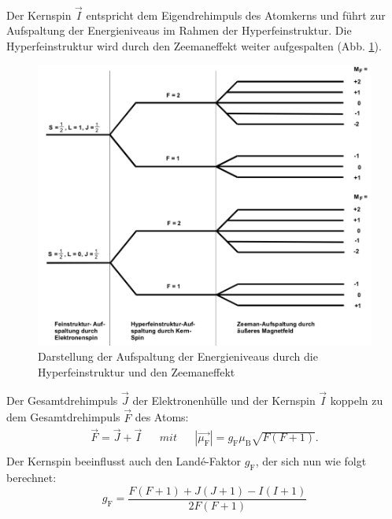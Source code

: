 %
\\Der Kernspin $\vec{I}$ entspricht dem Eigendrehimpuls des Atomkerns und führt zur Aufspaltung der Energieniveaus im Rahmen der Hyperfeinstruktur.
Die Hyperfeinstruktur wird durch den Zeemaneffekt weiter aufgespalten (Abb. \ref{fig:kernspin}).
\begin{figure}[h!]
  \centering
  \includegraphics[width=\textwidth]{kernspin1.png}
  \caption{Darstellung der Aufspaltung der Energieniveaus durch die Hyperfeinstruktur und den Zeemaneffekt \cite{1}}
  \label{fig:kernspin}
\end{figure}
Der Gesamtdrehimpuls $\vec{J}$ der Elektronenhülle und der Kernspin $\vec{I}$ koppeln zu dem Gesamtdrehimpuls $\vec{F}$ des Atoms:
\begin{align*}
  \vec{F}=\vec{J}+\vec{I} && mit && |\vec{\mu_{\text{F}}}|= g_{\text{F}} \mu_{\text{B}} \sqrt{F(F+1)}.\\
\end{align*}
Der Kernspin beeinflusst auch den Landé-Faktor $g_{\text{F}}$, der sich nun wie folgt berechnet:
\begin{equation}
  g_{\text{F}}= \frac{F(F+1) + J(J+1) - I(I+1)}{2 F(F+1)}
  \label{eqn:landef}
\end{equation}
%
